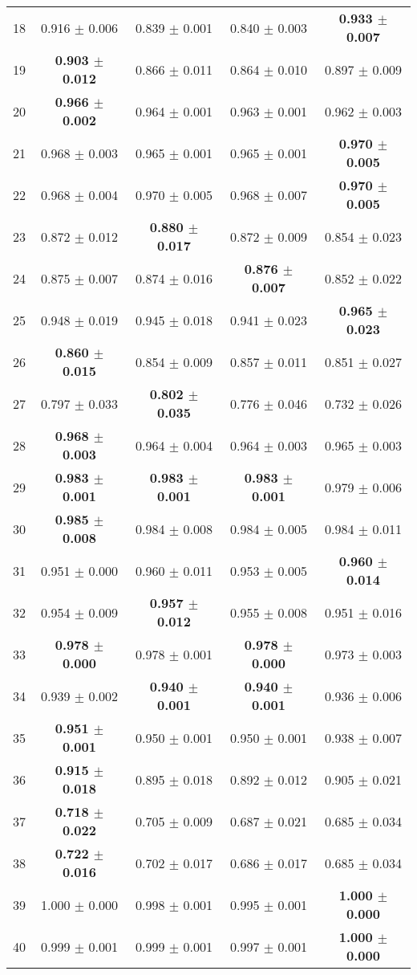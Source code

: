 \begin{table}[!ht]
{\begin{tabular}{r c c c c}
18 & 0.916 $\pm$ 0.006 & 0.839 $\pm$ 0.001 & 0.840 $\pm$ 0.003 & \textbf{0.933 $\pm$ 0.007} \\
19 & \textbf{0.903 $\pm$ 0.012} & 0.866 $\pm$ 0.011 & 0.864 $\pm$ 0.010 & 0.897 $\pm$ 0.009 \\
20 & \textbf{0.966 $\pm$ 0.002} & 0.964 $\pm$ 0.001 & 0.963 $\pm$ 0.001 & 0.962 $\pm$ 0.003 \\
21 & 0.968 $\pm$ 0.003 & 0.965 $\pm$ 0.001 & 0.965 $\pm$ 0.001 & \textbf{0.970 $\pm$ 0.005} \\
22 & 0.968 $\pm$ 0.004 & 0.970 $\pm$ 0.005 & 0.968 $\pm$ 0.007 & \textbf{0.970 $\pm$ 0.005} \\
23 & 0.872 $\pm$ 0.012 & \textbf{0.880 $\pm$ 0.017} & 0.872 $\pm$ 0.009 & 0.854 $\pm$ 0.023 \\
24 & 0.875 $\pm$ 0.007 & 0.874 $\pm$ 0.016 & \textbf{0.876 $\pm$ 0.007} & 0.852 $\pm$ 0.022 \\
25 & 0.948 $\pm$ 0.019 & 0.945 $\pm$ 0.018 & 0.941 $\pm$ 0.023 & \textbf{0.965 $\pm$ 0.023} \\
26 & \textbf{0.860 $\pm$ 0.015} & 0.854 $\pm$ 0.009 & 0.857 $\pm$ 0.011 & 0.851 $\pm$ 0.027 \\
27 & 0.797 $\pm$ 0.033 & \textbf{0.802 $\pm$ 0.035} & 0.776 $\pm$ 0.046 & 0.732 $\pm$ 0.026 \\
28 & \textbf{0.968 $\pm$ 0.003} & 0.964 $\pm$ 0.004 & 0.964 $\pm$ 0.003 & 0.965 $\pm$ 0.003 \\
29 & \textbf{0.983 $\pm$ 0.001} & \textbf{0.983 $\pm$ 0.001} & \textbf{0.983 $\pm$ 0.001} & 0.979 $\pm$ 0.006 \\
30 & \textbf{0.985 $\pm$ 0.008} & 0.984 $\pm$ 0.008 & 0.984 $\pm$ 0.005 & 0.984 $\pm$ 0.011 \\
31 & 0.951 $\pm$ 0.000 & 0.960 $\pm$ 0.011 & 0.953 $\pm$ 0.005 & \textbf{0.960 $\pm$ 0.014} \\
32 & 0.954 $\pm$ 0.009 & \textbf{0.957 $\pm$ 0.012} & 0.955 $\pm$ 0.008 & 0.951 $\pm$ 0.016 \\
33 & \textbf{0.978 $\pm$ 0.000} & 0.978 $\pm$ 0.001 & \textbf{0.978 $\pm$ 0.000} & 0.973 $\pm$ 0.003 \\
34 & 0.939 $\pm$ 0.002 & \textbf{0.940 $\pm$ 0.001} & \textbf{0.940 $\pm$ 0.001} & 0.936 $\pm$ 0.006 \\
35 & \textbf{0.951 $\pm$ 0.001} & 0.950 $\pm$ 0.001 & 0.950 $\pm$ 0.001 & 0.938 $\pm$ 0.007 \\
36 & \textbf{0.915 $\pm$ 0.018} & 0.895 $\pm$ 0.018 & 0.892 $\pm$ 0.012 & 0.905 $\pm$ 0.021 \\
37 & \textbf{0.718 $\pm$ 0.022} & 0.705 $\pm$ 0.009 & 0.687 $\pm$ 0.021 & 0.685 $\pm$ 0.034 \\
38 & \textbf{0.722 $\pm$ 0.016} & 0.702 $\pm$ 0.017 & 0.686 $\pm$ 0.017 & 0.685 $\pm$ 0.034 \\
39 & 1.000 $\pm$ 0.000 & 0.998 $\pm$ 0.001 & 0.995 $\pm$ 0.001 & \textbf{1.000 $\pm$ 0.000} \\
40 & 0.999 $\pm$ 0.001 & 0.999 $\pm$ 0.001 & 0.997 $\pm$ 0.001 & \textbf{1.000 $\pm$ 0.000} \\
\end{tabular}}
\end{table}
